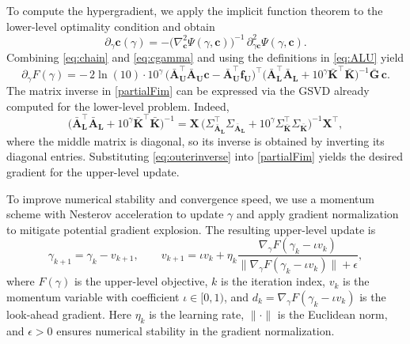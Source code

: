 \documentclass[12pt]{article}
\numberwithin{equation}{section}
\numberwithin{theorem}{section}
\begin{document}
To compute the hypergradient, we apply the implicit function theorem to the lower-level optimality condition and obtain
\begin{equation}
\label{eq:cgamma}
\partial_{\gamma}\mathbf{c}(\gamma)
= -\big(\nabla_{\mathbf{c}}^{2}\Psi(\gamma,\mathbf{c})\big)^{-1}
\,\partial_{\gamma\mathbf{c}}^{2}\Psi(\gamma,\mathbf{c}).
\end{equation}
Combining \eqref{eq:chain} and \eqref{eq:cgamma} and using the definitions in \eqref{eq:ALU} yield
\begin{equation}
\label{partialFim}
\partial_{\gamma}F(\gamma)
= -\,2\ln(10)\cdot 10^{\gamma}\,
\big(\bar{\mathbf{A}}_{\mathbf{U}}^{\top}\bar{\mathbf{A}}_{\mathbf{U}}\mathbf{c}-\bar{\mathbf{A}}_{\mathbf{U}}^{\top}\mathbf{f}_{\mathbf{U}}\big)^{\top}
\big(\bar{\mathbf{A}}_{\mathbf{L}}^{\top}\bar{\mathbf{A}}_{\mathbf{L}}+10^{\gamma}\bar{\mathbf{K}}^{\top}\bar{\mathbf{K}}\big)^{-1}
\bar{\mathbf{G}}\,\mathbf{c}.
\end{equation}
The matrix inverse in \eqref{partialFim} can be expressed via the GSVD already computed for the lower-level problem. Indeed,
\begin{equation}
\label{eq:outerinverse}
\big(\bar{\mathbf{A}}_{\mathbf{L}}^{\top}\bar{\mathbf{A}}_{\mathbf{L}}+10^{\gamma}\bar{\mathbf{K}}^{\top}\bar{\mathbf{K}}\big)^{-1}
=\mathbf{X}\,\big(\Sigma_{\bar{\mathbf{A}}_{\mathbf{L}}}^{\top}\Sigma_{\bar{\mathbf{A}}_{\mathbf{L}}}
+10^{\gamma}\Sigma_{\bar{\mathbf{K}}}^{\top}\Sigma_{\bar{\mathbf{K}}}\big)^{-1}\mathbf{X}^{\top},
\end{equation}
where the middle matrix is diagonal, so its inverse is obtained by inverting its diagonal entries. Substituting \eqref{eq:outerinverse} into \eqref{partialFim} yields the desired gradient for the upper-level update. 

To improve numerical stability and convergence speed, we use a momentum scheme with Nesterov acceleration \cite{nesterov1983method} to update $\gamma$ and apply gradient normalization \cite{baydin2018online} to mitigate potential gradient explosion. The resulting upper-level update is
\begin{equation}\label{eq:gradientnew}
\gamma_{k+1}=\gamma_k-v_{k+1},\qquad 
v_{k+1}=\iota  v_k+\eta_k\frac{\nabla_\gamma F(\gamma_k-\iota  v_k)}{\|\nabla_\gamma F(\gamma_k-\iota  v_k)\|+\epsilon},
\end{equation}
where $F(\gamma)$ is the upper-level objective, $k$ is the iteration index, $v_k$ is the momentum variable with coefficient $\iota  \in[0,1)$, and $d_k=\nabla_\gamma F\left(\gamma_k-\iota  v_k\right)$ is the look-ahead gradient. Here $\eta_k$ is the learning rate, $\|\cdot\|$ is the Euclidean norm, and $\epsilon>0$ ensures numerical stability in the gradient normalization.
\end{document}

